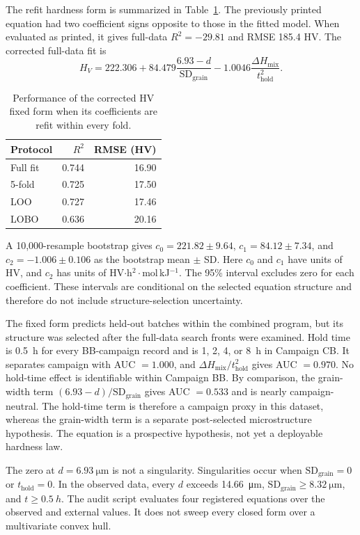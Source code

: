 \documentclass[a4paper,11pt]{article}
\begin{document}
The refit hardness form is summarized in Table~\ref{tab:hvfixed}. The previously printed equation had two coefficient signs opposite to those in the fitted model. When evaluated as printed, it gives full-data $R^2=-29.81$ and RMSE 185.4 HV. The corrected full-data fit is
\begin{equation}
H_V=222.306+84.479\frac{6.93-d}{\mathrm{SD}_{\mathrm{grain}}}
-1.0046\frac{\Delta H_{\mathrm{mix}}}{t_{\mathrm{hold}}^2}.
\end{equation}

\begin{table}[H]
\centering
\caption{Performance of the corrected HV fixed form when its coefficients are refit within every fold.}
\label{tab:hvfixed}
\begin{tabular}{lrr}
\toprule
Protocol & $R^2$ & RMSE (HV) \\
\midrule
Full fit & 0.744 & 16.90 \\
5-fold & 0.725 & 17.50 \\
LOO & 0.727 & 17.46 \\
LOBO & 0.636 & 20.16 \\
\bottomrule
\end{tabular}
\end{table}

A 10,000-resample bootstrap gives $c_0=221.82\pm9.64$, $c_1=84.12\pm7.34$, and $c_2=-1.006\pm0.106$ as the bootstrap mean $\pm$ SD. Here $c_0$ and $c_1$ have units of HV, and $c_2$ has units of HV$\cdot$h$^2\cdot$mol\,kJ$^{-1}$. The 95\% interval excludes zero for each coefficient. These intervals are conditional on the selected equation structure and therefore do not include structure-selection uncertainty.

The fixed form predicts held-out batches within the combined program, but its structure was selected after the full-data search fronts were examined. Hold time is 0.5~h for every BB-campaign record and is 1, 2, 4, or 8~h in Campaign CB. It separates campaign with AUC $=1.000$, and $\Delta H_{\mathrm{mix}}/t_{\mathrm{hold}}^2$ gives AUC $=0.970$. No hold-time effect is identifiable within Campaign BB. By comparison, the grain-width term $(6.93-d)/\mathrm{SD}_{\mathrm{grain}}$ gives AUC $=0.533$ and is nearly campaign-neutral. The hold-time term is therefore a campaign proxy in this dataset, whereas the grain-width term is a separate post-selected microstructure hypothesis. The equation is a prospective hypothesis, not yet a deployable hardness law.

The zero at $d=\SI{6.93}{\micro\meter}$ is not a singularity. Singularities occur when $\mathrm{SD}_{\mathrm{grain}}=0$ or $t_{\mathrm{hold}}=0$. In the observed data, every $d$ exceeds \SI{14.66}{\micro\meter}, $\mathrm{SD}_{\mathrm{grain}}\geq\SI{8.32}{\micro\meter}$, and $t\geq\SI{0.5}{h}$. The audit script evaluates four registered equations over the observed and external values. It does not sweep every closed form over a multivariate convex hull.
\end{document}
